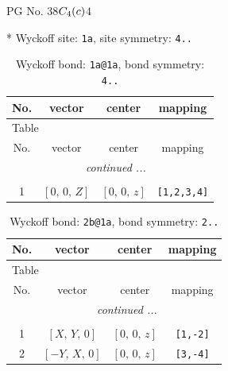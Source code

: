 \documentclass[fleqn,8pt]{jsarticle}
\begin{document}
\setcounter{MaxMatrixCols}{32}

\renewcommand{\tablename}{Table~}
\renewcommand{\figurename}{Figure~}
\begin{center}
\LARGE
PG No. 38\quad$C_{\rm 4}(c)$\quad$4$\quad[ tetragonal ]
\end{center}


* Wyckoff site: {\tt 1a}, site symmetry: {\tt 4..}
\renewcommand{\arraystretch}{1.2}
\begin{longtable}{cccc}
\caption{Wyckoff bond: {\tt 1a@1a}, bond symmetry: {\tt 4..}}
 \\
 \hline \hline
No. & vector & center & mapping \\ \hline \endfirsthead

\multicolumn{3}{l}{\tablename\ \thetable{}} \\
 \hline \hline
No. & vector & center & mapping \\ \hline \endhead

 \hline \hline
\multicolumn{3}{r}{\footnotesize\it continued ...} \\ \endfoot

 \hline \hline
\multicolumn{3}{r}{} \\ \endlastfoot

1 & $\left[ 0,\, 0,\, Z \right]$ & $\left[ 0,\, 0,\, z \right]$ & {\tt [1,2,3,4]} \\
\end{longtable}
\renewcommand{\arraystretch}{1.2}
\begin{longtable}{cccc}
\caption{Wyckoff bond: {\tt 2b@1a}, bond symmetry: {\tt 2..}}
 \\
 \hline \hline
No. & vector & center & mapping \\ \hline \endfirsthead

\multicolumn{3}{l}{\tablename\ \thetable{}} \\
 \hline \hline
No. & vector & center & mapping \\ \hline \endhead

 \hline \hline
\multicolumn{3}{r}{\footnotesize\it continued ...} \\ \endfoot

 \hline \hline
\multicolumn{3}{r}{} \\ \endlastfoot

1 & $\left[ X,\, Y,\, 0 \right]$ & $\left[ 0,\, 0,\, z \right]$ & {\tt [1,-2]} \\ \hline
2 & $\left[ - Y,\, X,\, 0 \right]$ & $\left[ 0,\, 0,\, z \right]$ & {\tt [3,-4]} \\
\end{longtable}
\end{document}
